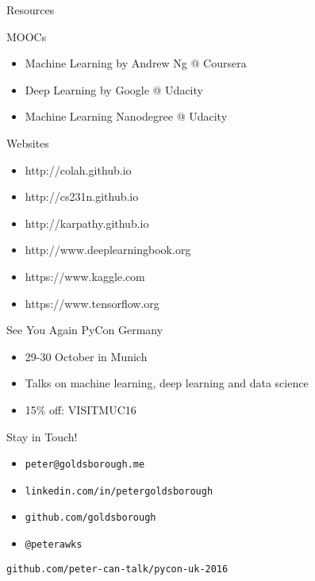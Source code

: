 

\begin{slide}{Resources}
  \begin{itemize}
    \pitem MOOCs
    \begin{itemize}
      \item Machine Learning by Andrew Ng @ Coursera
      \item Deep Learning by Google @ Udacity
      \item Machine Learning Nanodegree @ Udacity
    \end{itemize}
    \pitem Websites
    \begin{itemize}
      \item http://colah.github.io
      \item http://cs231n.github.io
      \item http://karpathy.github.io
      \item http://www.deeplearningbook.org
      \item https://www.kaggle.com
      \item https://www.tensorflow.org
    \end{itemize}
  \end{itemize}
\end{slide}

\begin{slide}{See You Again}
  {\huge PyCon Germany}\\
  \vspace{1cm}

  \begin{itemize}
    \item 29-30 October in Munich
    \item Talks on machine learning, deep learning and data science
    \item 15\% off: VISITMUC16
  \end{itemize}
\end{slide}

\begin{slide}{}
  {\huge Stay in Touch!}\\
  \vspace{1cm}
  \begin{itemize}
    \item \texttt{peter@goldsborough.me}
    \item \texttt{linkedin.com/in/petergoldsborough}
    \item \texttt{github.com/goldsborough}
    \item \texttt{@peterawks}
  \end{itemize}

  \pause
  \vspace{1cm}
  \texttt{github.com/peter-can-talk/pycon-uk-2016}
\end{slide}

